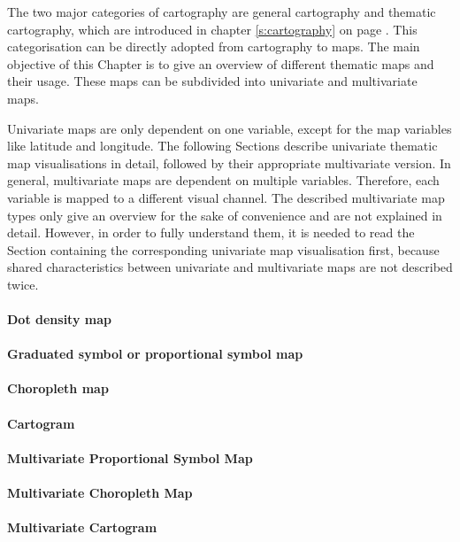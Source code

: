 The two major categories of cartography are general cartography and thematic cartography, which are introduced in chapter \ref{s:cartography} on page \pageref{s:cartography}. This categorisation can be directly adopted from cartography to maps. The main objective of this Chapter is to give an overview of different thematic maps and their usage. These maps can be subdivided into univariate and multivariate maps.

Univariate maps are only dependent on one variable, except for the map variables like latitude and longitude. The following Sections describe univariate thematic map visualisations in detail, followed by their appropriate multivariate version. In general, multivariate maps are dependent on multiple variables. Therefore, each variable is mapped to a different visual channel. The described multivariate map types only give an overview for the sake of convenience and are not explained in detail. However, in order to fully understand them, it is needed to read the Section containing the corresponding univariate map visualisation first, because shared characteristics between univariate and multivariate maps are not described twice.

\paragraph{Dot density map}
\label{s:dot}


\paragraph{Graduated symbol or proportional symbol map}


\paragraph{Choropleth map}

\label{s:choropleth}

\paragraph{Cartogram}


\paragraph{Multivariate Proportional Symbol Map}


\paragraph{Multivariate Choropleth Map}


\paragraph{Multivariate Cartogram}
